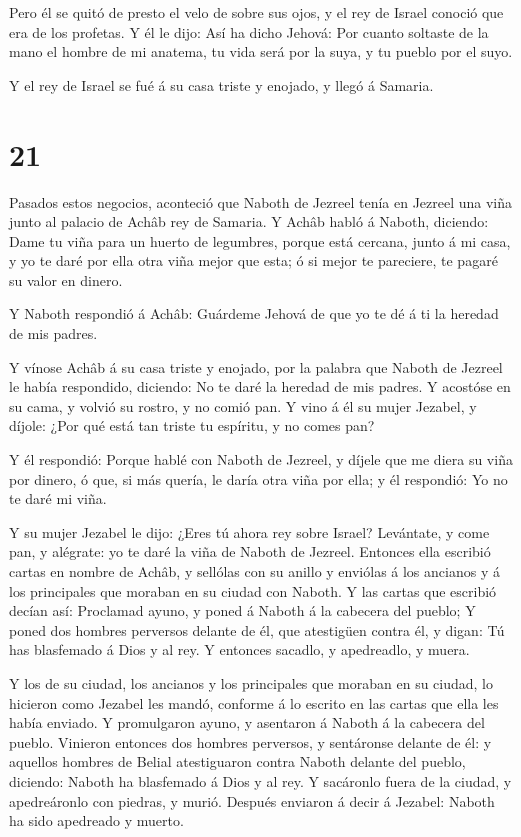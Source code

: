  Pero él se quitó de presto el velo de sobre sus ojos, y el
rey de Israel conoció que era de los profetas.  Y él le
dijo: Así ha dicho Jehová: Por cuanto soltaste de la mano el hombre de
mi anatema, tu vida será por la suya, y tu pueblo por el suyo.

 Y el rey de Israel se fué á su casa triste y enojado, y
llegó á Samaria.

\hypertarget{section-20}{%
\section{21}\label{section-20}}

 Pasados estos negocios, aconteció que Naboth de Jezreel
tenía en Jezreel una viña junto al palacio de Achâb rey de Samaria.
 Y Achâb habló á Naboth, diciendo: Dame tu viña para un
huerto de legumbres, porque está cercana, junto á mi casa, y yo te daré
por ella otra viña mejor que esta; ó si mejor te pareciere, te pagaré su
valor en dinero.

 Y Naboth respondió á Achâb: Guárdeme Jehová de que yo te dé
á ti la heredad de mis padres.

 Y vínose Achâb á su casa triste y enojado, por la palabra
que Naboth de Jezreel le había respondido, diciendo: No te daré la
heredad de mis padres. Y acostóse en su cama, y volvió su rostro, y no
comió pan.  Y vino á él su mujer Jezabel, y díjole: ¿Por qué
está tan triste tu espíritu, y no comes pan?

 Y él respondió: Porque hablé con Naboth de Jezreel, y
díjele que me diera su viña por dinero, ó que, si más quería, le daría
otra viña por ella; y él respondió: Yo no te daré mi viña.

 Y su mujer Jezabel le dijo: ¿Eres tú ahora rey sobre
Israel? Levántate, y come pan, y alégrate: yo te daré la viña de Naboth
de Jezreel.  Entonces ella escribió cartas en nombre de
Achâb, y sellólas con su anillo y enviólas á los ancianos y á los
principales que moraban en su ciudad con Naboth.  Y las
cartas que escribió decían así: Proclamad ayuno, y poned á Naboth á la
cabecera del pueblo;  Y poned dos hombres perversos delante
de él, que atestigüen contra él, y digan: Tú has blasfemado á Dios y al
rey. Y entonces sacadlo, y apedreadlo, y muera.

 Y los de su ciudad, los ancianos y los principales que
moraban en su ciudad, lo hicieron como Jezabel les mandó, conforme á lo
escrito en las cartas que ella les había enviado.  Y
promulgaron ayuno, y asentaron á Naboth á la cabecera del pueblo.
 Vinieron entonces dos hombres perversos, y sentáronse
delante de él: y aquellos hombres de Belial atestiguaron contra Naboth
delante del pueblo, diciendo: Naboth ha blasfemado á Dios y al rey. Y
sacáronlo fuera de la ciudad, y apedreáronlo con piedras, y murió.
 Después enviaron á decir á Jezabel: Naboth ha sido
apedreado y muerto.

